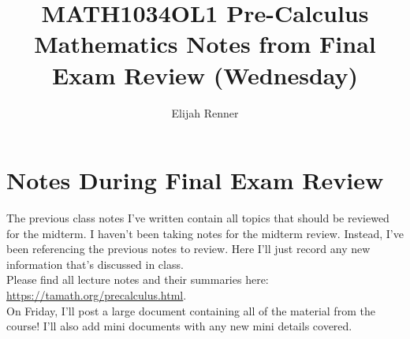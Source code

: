 \documentclass[12pt]{article}
\title{MATH1034OL1 Pre-Calculus Mathematics Notes from Final Exam Review (Wednesday)}
\author{Elijah Renner}
\begin{document}
\maketitle

\vspace{0.5in}

\tableofcontents

\section{Notes During Final Exam Review}

The previous class notes I've written contain all topics that should be reviewed for the midterm. I haven't been taking notes for the midterm review. Instead, I've been referencing the previous notes to review. Here I'll just record any new information that's discussed in class.\\

Please find all lecture notes and their summaries here: \url{https://tamath.org/precalculus.html}.\\

On Friday, I'll post a large document containing all of the material from the course! I'll also add mini documents with any new mini details covered.\\


%
\end{document}
